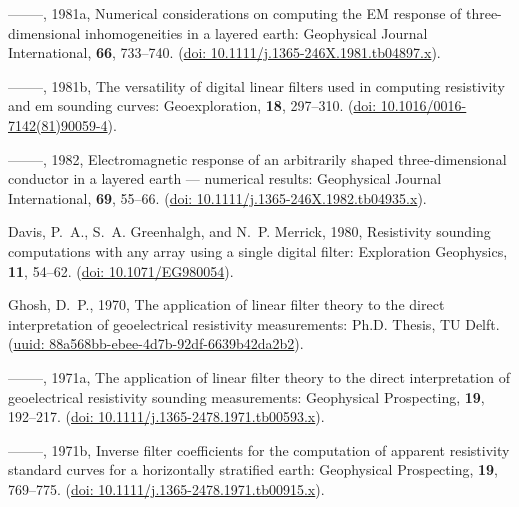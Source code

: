 \documentclass[paper,twocolumn,twoside]{geophysics}
\begin{document}
\begin{thebibliography}{}
--------, 1981a, Numerical considerations on computing the {EM} response of
  three-dimensional inhomogeneities in a layered earth: Geophysical Journal
  International, {\bf 66}, 733--740.
\newblock (\href{http://doi.org/10.1111/j.1365-246X.1981.tb04897.x}{doi:
  10.1111/j.1365-246X.1981.tb04897.x}).

--------, 1981b, The versatility of digital linear filters used in computing
  resistivity and em sounding curves: Geoexploration, {\bf 18}, 297--310.
\newblock (\href{http://doi.org/10.1016/0016-7142(81)90059-4}{doi:
  10.1016/0016-7142(81)90059-4}).

--------, 1982, Electromagnetic response of an arbitrarily shaped
  three-dimensional conductor in a layered earth — numerical results:
  Geophysical Journal International, {\bf 69}, 55--66.
\newblock (\href{http://doi.org/10.1111/j.1365-246X.1982.tb04935.x}{doi:
  10.1111/j.1365-246X.1982.tb04935.x}).

Davis, P.~A., S.~A. Greenhalgh, and N.~P. Merrick,  1980, Resistivity sounding
  computations with any array using a single digital filter: Exploration
  Geophysics, {\bf 11}, 54--62.
\newblock (\href{http://library.seg.org/doi/abs/10.1071/EG980054}{doi:
  10.1071/EG980054}).

Ghosh, D.~P.,  1970, The application of linear filter theory to the direct
  interpretation of geoelectrical resistivity measurements: {Ph.D. Thesis}, {TU
  Delft}.
\newblock
  (\href{http://resolver.tudelft.nl/uuid:88a568bb-ebee-4d7b-92df-6639b42da2b2}{uuid:
  88a568bb-ebee-4d7b-92df-6639b42da2b2}).

--------, 1971a, The application of linear filter theory to the direct
  interpretation of geoelectrical resistivity sounding measurements:
  Geophysical Prospecting, {\bf 19}, 192--217.
\newblock (\href{http://doi.org/10.1111/j.1365-2478.1971.tb00593.x}{doi:
  10.1111/j.1365-2478.1971.tb00593.x}).

--------, 1971b, Inverse filter coefficients for the computation of apparent
  resistivity standard curves for a horizontally stratified earth: Geophysical
  Prospecting, {\bf 19}, 769--775.
\newblock (\href{http://doi.org/10.1111/j.1365-2478.1971.tb00915.x}{doi:
  10.1111/j.1365-2478.1971.tb00915.x}).


\end{thebibliography}
\end{document}
